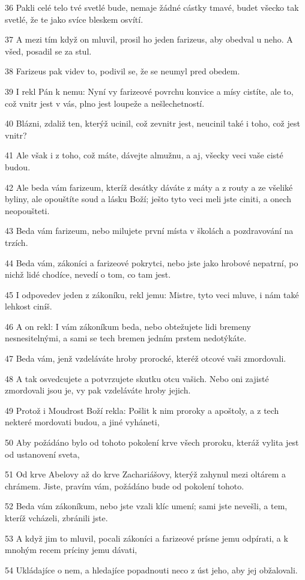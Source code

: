 \par 36 Pakli celé telo tvé svetlé bude, nemaje žádné cástky tmavé, budet všecko tak svetlé, že te jako svíce bleskem osvítí.
\par 37 A mezi tím když on mluvil, prosil ho jeden farizeus, aby obedval u neho. A všed, posadil se za stul.
\par 38 Farizeus pak videv to, podivil se, že se neumyl pred obedem.
\par 39 I rekl Pán k nemu: Nyní vy farizeové povrchu konvice a mísy cistíte, ale to, což vnitr jest v vás, plno jest loupeže a nešlechetností.
\par 40 Blázni, zdaliž ten, kterýž ucinil, což zevnitr jest, neucinil také i toho, což jest vnitr?
\par 41 Ale však i z toho, což máte, dávejte almužnu, a aj, všecky veci vaše cisté budou.
\par 42 Ale beda vám farizeum, kteríž desátky dáváte z máty a z routy a ze všeliké byliny, ale opouštíte soud a lásku Boží; ješto tyto veci meli jste ciniti, a onech neopoušteti.
\par 43 Beda vám farizeum, nebo milujete první místa v školách a pozdravování na trzích.
\par 44 Beda vám, zákoníci a farizeové pokrytci, nebo jste jako hrobové nepatrní, po nichž lidé chodíce, nevedí o tom, co tam jest.
\par 45 I odpovedev jeden z zákoníku, rekl jemu: Mistre, tyto veci mluve, i nám také lehkost ciníš.
\par 46 A on rekl: I vám zákoníkum beda, nebo obtežujete lidi bremeny nesnesitelnými, a sami se tech bremen jedním prstem nedotýkáte.
\par 47 Beda vám, jenž vzdeláváte hroby prorocké, kteréž otcové vaši zmordovali.
\par 48 A tak osvedcujete a potvrzujete skutku otcu vašich. Nebo oni zajisté zmordovali jsou je, vy pak vzdeláváte hroby jejich.
\par 49 Protož i Moudrost Boží rekla: Pošlit k nim proroky a apoštoly, a z tech nekteré mordovati budou, a jiné vyháneti,
\par 50 Aby požádáno bylo od tohoto pokolení krve všech proroku, kteráž vylita jest od ustanovení sveta,
\par 51 Od krve Abelovy až do krve Zachariášovy, kterýž zahynul mezi oltárem a chrámem. Jiste, pravím vám, požádáno bude od pokolení tohoto.
\par 52 Beda vám zákoníkum, nebo jste vzali klíc umení; sami jste nevešli, a tem, kteríž vcházeli, zbránili jste.
\par 53 A když jim to mluvil, pocali zákoníci a farizeové prísne jemu odpírati, a k mnohým recem príciny jemu dávati,
\par 54 Ukládajíce o nem, a hledajíce popadnouti neco z úst jeho, aby jej obžalovali.

